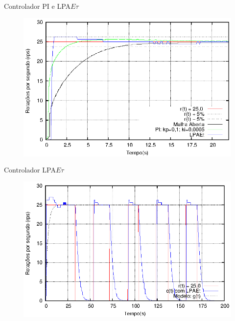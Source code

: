 \begin{frame}{Controlador PI e LPA$E\tau$}

\vspace{-0.5cm}
\begin{figure}[!htb]
\center\includegraphics[scale=1.0]{./imagens/resAcaoPI.eps}
\label{fig:resAcaoPI}

\end{figure}


\end{frame}


\begin{frame}{Controlador LPA$E\tau$}

\vspace{-0.5cm}
\begin{figure}[!htb]
\center\includegraphics[scale=1.0]{./imagens/LPAEt-delta.eps}
\label{fig:lpaetDelta}

\end{figure}


\end{frame}



